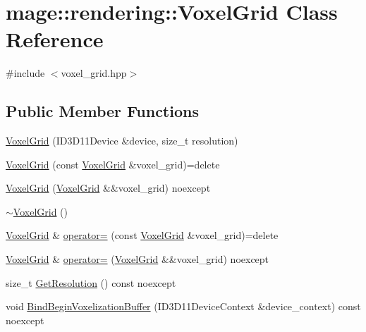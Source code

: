 \hypertarget{classmage_1_1rendering_1_1_voxel_grid}{}\section{mage\+:\+:rendering\+:\+:Voxel\+Grid Class Reference}
\label{classmage_1_1rendering_1_1_voxel_grid}


{\ttfamily \#include $<$voxel\+\_\+grid.\+hpp$>$}

\subsection*{Public Member Functions}
\begin{DoxyCompactItemize}
\item 
\hyperlink{classmage_1_1rendering_1_1_voxel_grid_aec475857836dbf56d99f30a9d8f70272}{Voxel\+Grid} (I\+D3\+D11\+Device \&device, size\+\_\+t resolution)
\item 
\hyperlink{classmage_1_1rendering_1_1_voxel_grid_ace9aac1356e41996630c6247ece48417}{Voxel\+Grid} (const \hyperlink{classmage_1_1rendering_1_1_voxel_grid}{Voxel\+Grid} \&voxel\+\_\+grid)=delete
\item 
\hyperlink{classmage_1_1rendering_1_1_voxel_grid_a985cc9f8fbe4e49adf2b61de2b348125}{Voxel\+Grid} (\hyperlink{classmage_1_1rendering_1_1_voxel_grid}{Voxel\+Grid} \&\&voxel\+\_\+grid) noexcept
\item 
\hyperlink{classmage_1_1rendering_1_1_voxel_grid_aa349c9ddd6d6be9f12d7e399a0931f89}{$\sim$\+Voxel\+Grid} ()
\item 
\hyperlink{classmage_1_1rendering_1_1_voxel_grid}{Voxel\+Grid} \& \hyperlink{classmage_1_1rendering_1_1_voxel_grid_a90b94d3a00e365e1a03d1077a5c79a11}{operator=} (const \hyperlink{classmage_1_1rendering_1_1_voxel_grid}{Voxel\+Grid} \&voxel\+\_\+grid)=delete
\item 
\hyperlink{classmage_1_1rendering_1_1_voxel_grid}{Voxel\+Grid} \& \hyperlink{classmage_1_1rendering_1_1_voxel_grid_a9e0ae3de8c583879a3db8b6d787138ac}{operator=} (\hyperlink{classmage_1_1rendering_1_1_voxel_grid}{Voxel\+Grid} \&\&voxel\+\_\+grid) noexcept
\item 
size\+\_\+t \hyperlink{classmage_1_1rendering_1_1_voxel_grid_ab38b97d6f567f2f44fa000a6bb9f305c}{Get\+Resolution} () const noexcept
\item 
void \hyperlink{classmage_1_1rendering_1_1_voxel_grid_a52254c5709b77d6c348eb15b782b5bc4}{Bind\+Begin\+Voxelization\+Buffer} (I\+D3\+D11\+Device\+Context \&device\+\_\+context) const noexcept

\end{DoxyCompactItemize}
